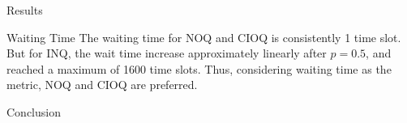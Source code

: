 \begin{section}{Results}
    \begin{subsection}{Waiting Time}
    The waiting time for NOQ and CIOQ is consistently 1 time slot. But for INQ, the wait time increase approximately linearly after $p=0.5$, and reached a maximum of 1600 time slots. Thus, considering waiting time as the metric, NOQ and CIOQ are preferred.
    \end{subsection}
    

\end{section}

\begin{section}{Conclusion}

\end{section}
